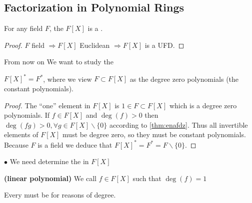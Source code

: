 \documentclass{article}
\newcommand{\bfs}[1]{\textbf{({#1}) }}
\begin{document}
\centerline{}


\subsection{Factorization in Polynomial Rings}
\begin{thma}\label{thm:ienaqdad}
For any field $F$, the  $F[X]$ is a .
\end{thma}
\begin{proof}
 $F$ field $\Rightarrow F[X]$ Euclidean $\Rightarrow F[X]$ is a UFD.
\end{proof} 
From now on  We want to study the 

\begin{lema}
$F[X]^{*}=F^{*}$, where we view $F \subset F[X]$ as the degree zero polynomials (the constant polynomials).
\end{lema} 
\begin{proof}
 The ``one'' element in $F[X]$ is $1 \in F \subset F[X]$ which is a degree zero polynomials. If $f \in F[X]$ and $\deg(f)>0$ then $\deg(f g)>0, \forall g \in F[X] \backslash\{0\}$ according to \cref{thm:enafdz}. Thus all invertible elements of $F[X]$ must be degree zero, so they must be constant polynomials. Because $F$ is a field we deduce that $F[X]^{*}=F^{*}=F\backslash \{0\}$.
\end{proof}

$\bullet$ We need determine the  in $F[X]$%



\begin{defa}\bfs{linear polynomial}
We call $f \in F[X]$ such that $\deg(f)=1$ 
\end{defa}
\begin{lema}
Every  must be  for reasons of degree. 
\end{lema}
\end{document}
